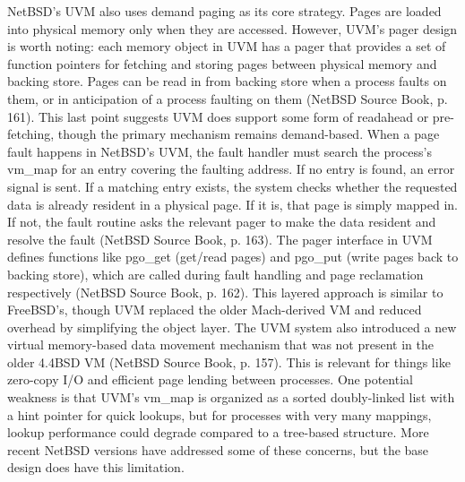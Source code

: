 NetBSD's UVM also uses demand paging as its core strategy. Pages are loaded into physical memory only when they are accessed. However, UVM's pager design is worth noting: each memory object in UVM has a pager that provides a set of function pointers for fetching and storing pages between physical memory and backing store. Pages can be read in from backing store when a process faults on them, or in anticipation of a process faulting on them (NetBSD Source Book, p. 161). This last point suggests UVM does support some form of readahead or pre-fetching, though the primary mechanism remains demand-based.
When a page fault happens in NetBSD's UVM, the fault handler must search the process's vm\_map for an entry covering the faulting address. If no entry is found, an error signal is sent. If a matching entry exists, the system checks whether the requested data is already resident in a physical page. If it is, that page is simply mapped in. If not, the fault routine asks the relevant pager to make the data resident and resolve the fault (NetBSD Source Book, p. 163). The pager interface in UVM defines functions like pgo\_get (get/read pages) and pgo\_put (write pages back to backing store), which are called during fault handling and page reclamation respectively (NetBSD Source Book, p. 162). This layered approach is similar to FreeBSD's, though UVM replaced the older Mach-derived VM and reduced overhead by simplifying the object layer.
The UVM system also introduced a new virtual memory-based data movement mechanism that was not present in the older 4.4BSD VM (NetBSD Source Book, p. 157). This is relevant for things like zero-copy I/O and efficient page lending between processes. One potential weakness is that UVM's vm\_map is organized as a sorted doubly-linked list with a hint pointer for quick lookups, but for processes with very many mappings, lookup performance could degrade compared to a tree-based structure. More recent NetBSD versions have addressed some of these concerns, but the base design does have this limitation.

